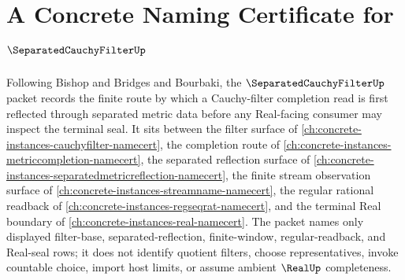 \chapter{A Concrete Naming Certificate for $\SeparatedCauchyFilterUp$}
\label{ch:concrete-instances-separated-cauchy-filter-namecert}

Following Bishop and Bridges and Bourbaki, the $\SeparatedCauchyFilterUp$ packet records the finite route by which a Cauchy-filter completion read is first reflected through separated metric data before any Real-facing consumer may inspect the terminal seal. It sits between the filter surface of \autoref{ch:concrete-instances-cauchyfilter-namecert}, the completion route of \autoref{ch:concrete-instances-metriccompletion-namecert}, the separated reflection surface of \autoref{ch:concrete-instances-separatedmetricreflection-namecert}, the finite stream observation surface of \autoref{ch:concrete-instances-streamname-namecert}, the regular rational readback of \autoref{ch:concrete-instances-regseqrat-namecert}, and the terminal Real boundary of \autoref{ch:concrete-instances-real-namecert}. The packet names only displayed filter-base, separated-reflection, finite-window, regular-readback, and Real-seal rows; it does not identify quotient filters, choose representatives, invoke countable choice, import host limits, or assume ambient $\RealUp$ completeness.

